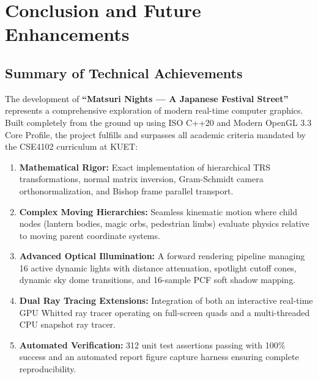 \chapter{Conclusion and Future Enhancements}
\label{chap:conclusion}

\section{Summary of Technical Achievements}
The development of \textbf{``Matsuri Nights --- A Japanese Festival Street''} represents a comprehensive exploration of modern real-time computer graphics. Built completely from the ground up using ISO C++20 and Modern OpenGL 3.3 Core Profile, the project fulfills and surpasses all academic criteria mandated by the CSE4102 curriculum at KUET:
\begin{enumerate}
    \item \textbf{Mathematical Rigor:} Exact implementation of hierarchical TRS transformations, normal matrix inversion, Gram-Schmidt camera orthonormalization, and Bishop frame parallel transport.
    \item \textbf{Complex Moving Hierarchies:} Seamless kinematic motion where child nodes (lantern bodies, magic orbs, pedestrian limbs) evaluate physics relative to moving parent coordinate systems.
    \item \textbf{Advanced Optical Illumination:} A forward rendering pipeline managing 16 active dynamic lights with distance attenuation, spotlight cutoff cones, dynamic sky dome transitions, and 16-sample PCF soft shadow mapping.
    \item \textbf{Dual Ray Tracing Extensions:} Integration of both an interactive real-time GPU Whitted ray tracer operating on full-screen quads and a multi-threaded CPU snapshot ray tracer.
    \item \textbf{Automated Verification:} 312 unit test assertions passing with 100\% success and an automated report figure capture harness ensuring complete reproducibility.
\end{enumerate}

